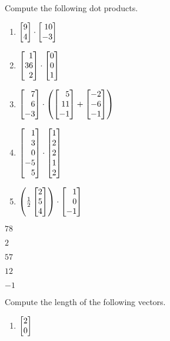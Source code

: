 \begin{exercises}
	\begin{problist}
		\prob  Compute the following dot products.
		\begin{enumerate}
			\item   $\mat{9\\4} \cdot \mat{10\\-3}$
			\item   $\mat{1\\36\\2} \cdot \mat{0\\0\\1}$
			\item   $\mat{7\\6\\-3} \cdot \left(\mat{5\\11\\-1} + \mat{-2\\-6\\-1}\right)$
			\item   $\mat{1\\3\\0\\-5\\5} \cdot \mat{1\\2\\2\\1\\2}$
			\item   $\left(\frac{1}{2}\mat{2\\5\\4}\right) \cdot \mat{1\\0\\-1}$
		\end{enumerate}
		\begin{solution}
			\begin{enumerate*}
				\item $78$
				\item $2$
				\item $57$
				\item $12$
				\item $-1$
			\end{enumerate*}
		\end{solution}
		\prob Compute the length of the following vectors.
		\begin{enumerate}
			\item $\mat{2\\0}$

\end{enumerate}
\end{problist}
\end{exercises}
